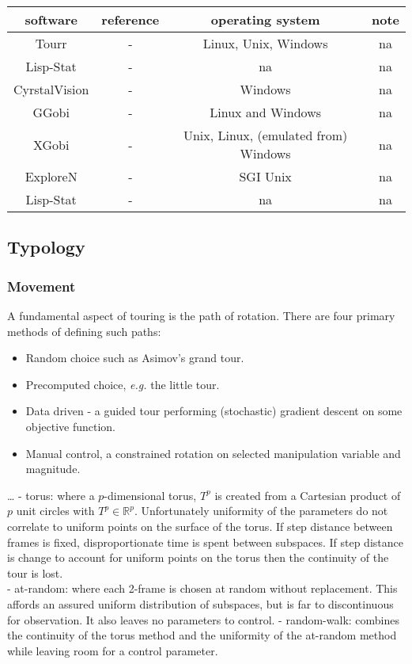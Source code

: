 \documentclass{monashthesis}
\begin{document}
\begin{table}[h!]
\centering
 \begin{tabular}{||c c c c||} 
 \hline
 software & reference & operating system & note \\
 \hline\hline
 Tourr & - & Linux, Unix, Windows & na \\
 Lisp-Stat & - & na & na \\
 CyrstalVision & - & Windows & na \\
 GGobi & - & Linux and Windows & na \\
 XGobi & - & Unix, Linux, (emulated from) Windows & na \\
 ExploreN & - & SGI Unix & na \\
 Lisp-Stat & - & na & na \\
 \hline
 \end{tabular}
\end{table}

\subsection{Typology}\label{typology}

\subsubsection{Movement}\label{movement}

A fundamental aspect of touring is the path of rotation. There are four
primary methods of defining such
paths\autocite{buja_computational_2005}:

\begin{itemize}
\tightlist
\item
  Random choice such as Asimov's grand tour\autocite{asimov_grand_1985}.
\item
  Precomputed choice, \emph{e.g.} the little
  tour\autocite{mcdonald_interactive_1982}.
\item
  Data driven - a guided tour performing (stochastic) gradient descent
  on some objective function\autocite{hurley_analyzing_1990}.
\item
  Manual control, a constrained rotation on selected manipulation
  variable and magnitude\autocite{cook_manual_1997}.
\end{itemize}

\ldots{} - torus: where a \(p\)-dimensional torus, \(T^p\) is created
from a Cartesian product of \(p\) unit circles with
\(T^p \in \mathbb{R}^p\). Unfortunately uniformity of the parameters do
not correlate to uniform points on the surface of the torus. If step
distance between frames is fixed, disproportionate time is spent between
subspaces. If step distance is change to account for uniform points on
the torus then the continuity of the tour is lost.\\
- at-random: where each 2-frame is chosen at random without replacement.
This affords an assured uniform distribution of subspaces, but is far to
discontinuous for observation. It also leaves no parameters to control.
- random-walk: combines the continuity of the torus method and the
uniformity of the at-random method while leaving room for a control
parameter.
\end{document}
